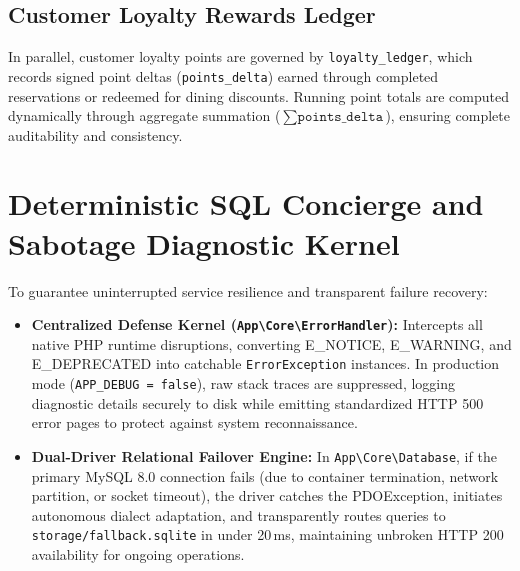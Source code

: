 \subsection{Customer Loyalty Rewards Ledger}
In parallel, customer loyalty points are governed by \texttt{loyalty\_ledger}, which records signed point deltas (\texttt{points\_delta}) earned through completed reservations or redeemed for dining discounts. Running point totals are computed dynamically through aggregate summation ($\sum \texttt{points\_delta}$), ensuring complete auditability and consistency.

\section{Deterministic SQL Concierge and Sabotage Diagnostic Kernel}
\label{sec:feat_defense_kernel}
To guarantee uninterrupted service resilience and transparent failure recovery:
\begin{itemize}
    \item \textbf{Centralized Defense Kernel (\texttt{App\textbackslash Core\textbackslash ErrorHandler}):} Intercepts all native PHP runtime disruptions, converting E\_NOTICE, E\_WARNING, and E\_DEPRECATED into catchable \texttt{ErrorException} instances. In production mode (\texttt{APP\_DEBUG = false}), raw stack traces are suppressed, logging diagnostic details securely to disk while emitting standardized HTTP 500 error pages to protect against system reconnaissance.
    \item \textbf{Dual-Driver Relational Failover Engine:} In \texttt{App\textbackslash Core\textbackslash Database}, if the primary MySQL 8.0 connection fails (due to container termination, network partition, or socket timeout), the driver catches the PDOException, initiates autonomous dialect adaptation, and transparently routes queries to \texttt{storage/fallback.sqlite} in under 20\,ms, maintaining unbroken HTTP 200 availability for ongoing operations.
\end{itemize}
